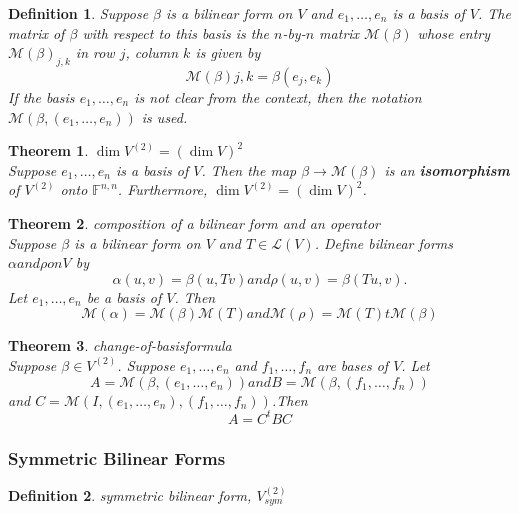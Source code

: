 \documentclass{article}
\newtheorem{theorem}{Theorem}[subsection]
\newtheorem{definition}{Definition}[subsection]
\newcommand{\FF}{\mathbb{F}}
\begin{document}
\begin{CJK}{UTF8}{gkai}
\begin{definition}
    Suppose $\beta$ is a bilinear form on $V$ and $e_1,\ldots,e_n$ is a basis of $V$. The matrix of $\beta$ with respect to this basis is the $n$-by-$n$ matrix $\mathcal{M}(\beta)$ whose entry $\mathcal{M}(\beta)_{j,k}$ in row $j$, column $k$ is given by
    \[\mathcal{M}(\beta)j,k = \beta(e_j,e_k)\]
    If the basis $e_1,\ldots,e_n$ is not clear from the context, then the notation $\mathcal{M}(\beta,(e_1,\ldots,e_n))$ is used.

\end{definition}

\begin{theorem}
    $\dim V^{(2)} = (\dim V)^2$\\

    Suppose $e_1,\ldots,e_n$ is a basis of $V$. Then the map $\beta \to \mathcal{M}(\beta)$ is an \textbf{isomorphism} of $V^{(2)}$ onto $\FF^{n,n}$. Furthermore, $\dim V^{(2)} = (\dim V)^2$.
\end{theorem}

\begin{theorem}
    composition of a bilinear form and an operator\\
    
    Suppose $\beta$ is a bilinear form on $V$ and $T \in \mathcal{L}(V)$. Define bilinear forms $\alpha and \rho on V$ by 
    \[\alpha(u,v) = \beta(u,Tv) and \rho(u,v) = \beta(Tu,v).\]
    Let $e_1,\ldots,e_n$ be a basis of $V$. Then
    \[\mathcal{M}(\alpha) = \mathcal{M}(\beta)\mathcal{M}(T) and \mathcal{M}(\rho)=\mathcal{M}(T)t\mathcal{M}(\beta)\]
\end{theorem}

\begin{theorem}
    change-of-basisformula\\

    Suppose $\beta\in V^{(2)}$. Suppose $e_1,\ldots,e_n$ and $f_1,\ldots, f_n$ are bases of $V$. Let
    \[A=\mathcal{M}(\beta,(e_1,\ldots,e_n)) and B=\mathcal{M}(\beta,(f_1,\ldots, f_n))\]
    and $C=\mathcal{M}(I,(e_1,\ldots,e_n),(f_1,\ldots, f_n))$.Then
    \[A=C^t B C\]
\end{theorem}

\subsubsection{Symmetric Bilinear Forms}

\begin{definition}
    symmetric bilinear form, $V^{(2)}_{sym}$\\


\end{definition}
\end{CJK}
\end{document}
